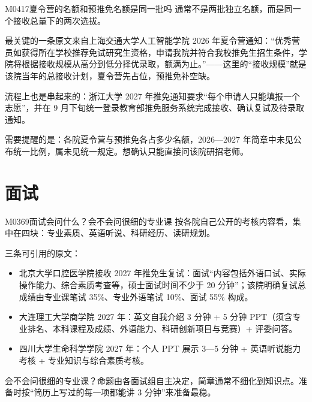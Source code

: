 \begin{qa}{M0417}{夏令营的名额和预推免名额是同一批吗}
通常不是两批独立名额，而是同一个接收总量下的两次选拔。

最关键的一条原文来自上海交通大学人工智能学院 2026 年夏令营通知：“优秀营员如获得所在学校推荐免试研究生资格，申请我院并符合我校推免生招生条件，学院将根据接收规模从高分到低分择优录取，额满为止。”——这里的“接收规模”就是该院当年的总接收计划，夏令营先占位，预推免补空缺。

流程上也是串起来的：浙江大学 2027 年推免通知要求“每个申请人只能填报一个志愿”，并在 9 月下旬统一登录教育部推免服务系统完成接收、确认复试及待录取通知。

需要提醒的是：各院夏令营与预推免各占多少名额，2026—2027 年简章中未见公布统一比例，属未见统一规定。想确认只能直接问该院研招老师。
\end{qa}

\section{面试}
\begin{qa}{M0369}{面试会问什么？会不会问很细的专业课}
按各院自己公开的考核内容看，集中在四块：专业素质、英语听说、科研经历、读研规划。

三条可引用的原文：
\begin{itemize}
  \item 北京大学口腔医学院接收 2027 年推免生复试：面试“内容包括外语口试、实际操作能力、综合素质考查等，硕士面试时间不少于 20 分钟”；该院明确复试总成绩由专业课笔试 35\%、专业外语笔试 10\%、面试 55\% 构成。
  \item 大连理工大学商学院 2027 年：英文自我介绍 3 分钟 + 5 分钟 PPT（须含专业排名、本科课程及成绩、外语能力、科研创新项目与竞赛）+ 评委问答。
  \item 四川大学生命科学学院 2027 年：个人 PPT 展示 3—5 分钟 + 英语听说能力考核 + 专业知识与综合素质考核。
\end{itemize}

会不会问很细的专业课？命题由各面试组自主决定，简章通常不细化到知识点。准备时按“简历上写过的每一项都能讲 3 分钟”来准备最稳。
\end{qa}

